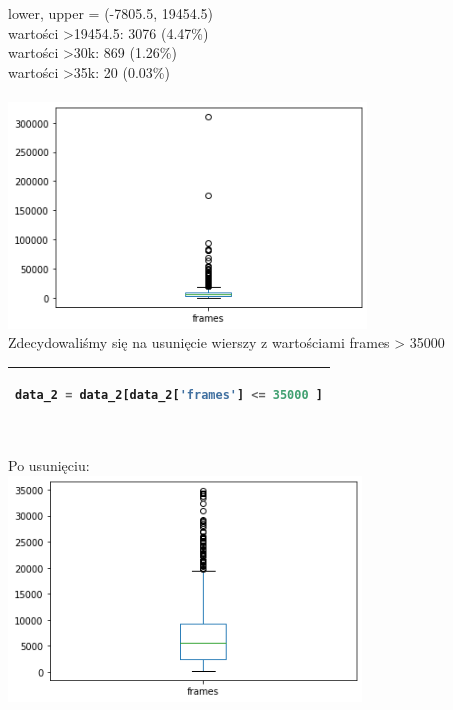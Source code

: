 \documentclass[11pt, a4paper]{article}
\begin{document}
    lower, upper = (-7805.5, 19454.5)\\
    wartości >19454.5: 3076 (4.47\%)\\
    wartości >30k: 869 (1.26\%)\\
    wartości >35k: 20 (0.03\%)\\
    \vspace{0.5cm} \\
    \includegraphics[height=170pt]{graphics/frames_before.png}
    \vspace{0.5cm} \\
    Zdecydowaliśmy się na usunięcie wierszy z wartościami frames > 35000\\
    
    \vspace{0.5cm} 
    \begin{tabular}{|l|}
        \hline
        \begin{lstlisting}[language=Python]
 data_2 = data_2[data_2['frames'] <= 35000 ]
        \end{lstlisting}
        \\ \hline
    \end{tabular}
    \vspace{0.5cm} \\
    
    Po usunięciu:\\
    
    \includegraphics[height=170pt]{graphics/frames_after.png}
\end{document}
